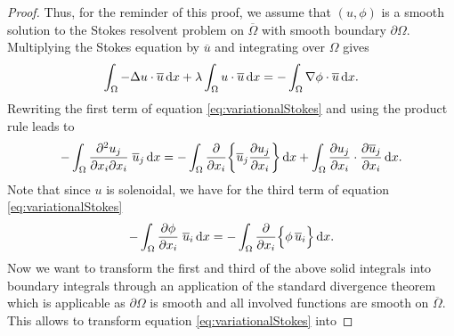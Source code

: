 \begin{proof}
  Thus, for the reminder of this proof, we assume that $(u,\phi)$ is a smooth solution to the Stokes resolvent problem on $\overline\Omega$ with smooth boundary $\partial\Omega$.
  Multiplying the Stokes equation by $\overline u$ and integrating over $\Omega$ gives
  \begin{align}
    \label{eq:variationalStokes}
    \int_\Omega -\Delta u \cdot \overline u \, {\operatorname{d}\!{x}} + \lambda \int_\Omega u \cdot \overline u \, {\operatorname{d}\!{x}}= - \int_\Omega \nabla \phi \cdot \overline u \, {\operatorname{d}\!{x}}.
  \end{align}
  Rewriting the first term of equation \eqref{eq:variationalStokes} and using the product rule leads to 
  \begin{align*}
    -\int_{\Omega} \frac{\partial^2 u_j}{\partial x_i \partial x_i}  \; \overline u_j \, {\operatorname{d}\!{x}}
    = -\int_{\Omega} \frac{\partial }{\partial x_i} \bigg\{ \overline u_j \frac{\partial u_j}{\partial x_i} \bigg\} \, {\operatorname{d}\!{x}} + \int_\Omega \frac{\partial u_j}{\partial x_i} \cdot \frac{\partial \overline u_j}{\partial x_i} \, {\operatorname{d}\!{x}}.
    \end{align*}
  Note that since $u$ is solenoidal, we have for the third term of equation \eqref{eq:variationalStokes}
  \begin{align*}
    - \int_{\Omega} \frac{\partial \phi}{\partial x_i} \; \overline u_i \, {\operatorname{d}\!{x}} = - \int_{\Omega} \frac{\partial}{\partial x_i} \Big\{ \phi\,  \overline u_i \Big\} \, {\operatorname{d}\!{x}}.
  \end{align*}
  Now we want to transform the first and third of the above solid integrals into boundary integrals through an application of the standard divergence theorem which is applicable as $\partial\Omega$ is smooth and all involved functions are smooth on $\overline\Omega$.
  This allows to transform equation \eqref{eq:variationalStokes} into

\end{proof}
